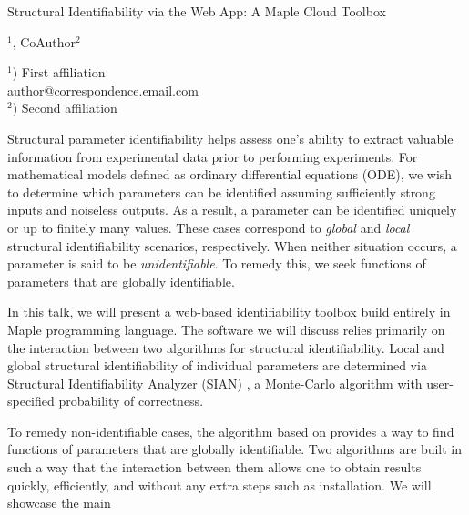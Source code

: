 \documentclass[a4paper]{article}
\begin{document}

\Large
\begin{center}
    Structural Identifiability via the Web App: A Maple Cloud Toolbox \\

    \hspace{10pt}

    \large
    $^1$, CoAuthor$^2$ \\

    \hspace{10pt}

    \small
    $^1$) First affiliation\\
    author@correspondence.email.com\\
    $^2$) Second affiliation

\end{center}

\hspace{10pt}

\normalsize


Structural parameter identifiability helps assess one's ability to extract valuable information from experimental data prior to performing experiments. For mathematical models defined as ordinary differential equations (ODE), we wish to determine which parameters can be identified assuming sufficiently strong inputs and noiseless outputs. As a result, a parameter can be identified uniquely or up to finitely many values. These cases correspond to \emph{global} and \emph{local} structural identifiability scenarios, respectively. When neither situation occurs, a parameter is said to be \emph{unidentifiable}. To remedy this, we seek functions of parameters that are globally identifiable.

In this talk, we will present a web-based identifiability toolbox build entirely in Maple programming language. The software we will discuss relies primarily on the interaction between two algorithms for structural identifiability. Local and global structural identifiability of individual parameters are determined via Structural Identifiability Analyzer (SIAN) \cite{hong_global_2020,hong_sian_2019}, a Monte-Carlo algorithm with user-specified probability of correctness.

To remedy non-identifiable cases, the algorithm based on \cite{ovchinnikov2020computing,ovchinnikov2020multi} provides a way to find functions of parameters that are globally identifiable. Two algorithms are built in such a way that the interaction between them allows one to obtain results quickly, efficiently, and without any extra steps such as installation. We will showcase the main

\printbibliography{}
\end{document}
